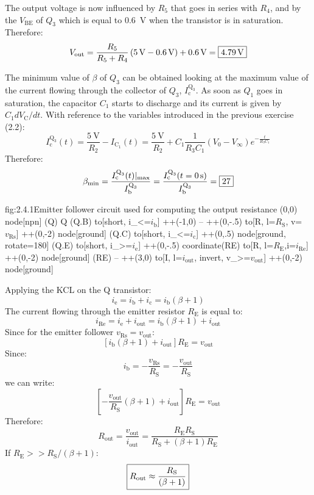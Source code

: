 The output voltage is now influenced by $R_5$ that goes in series with $R_4$, and by the $V_\text{BE}$ of $Q_3$ which is equal to \SI{0.6}{\volt} when the transistor is in saturation. Therefore:
\[V_\text{out}=\frac{R_5}{R_5+R_4}\left(\SI{5}{\volt}-\SI{0.6}{\volt}\right)+\SI{0.6}{\volt}=\boxed{\SI{4.79}{\volt}}\]

The minimum value of $\beta$ of $Q_3$ can be obtained looking at the maximum value of the current flowing through the collector of $Q_3$, $I_\text{c}^{\text{Q}_3}$. As soon as $Q_1$ goes in saturation, the capacitor $C_1$ starts to discharge and its current is given by $C_1dV_\text{C}/dt$. With reference to the variables introduced in the previous exercise (2.2):
\[I_\text{c}^{\text{Q}_3}(t)=\frac{\SI{5}{\volt}}{R_2}-I_{\text{C}_1}(t)=\frac{\SI{5}{\volt}}{R_2}+C_1\frac{1}{R_3C_1}\left(V_0-V_\infty\right)e^{-\frac{t}{R_3C_1}}\]
Therefore:
\[\beta_\text{min}=\frac{I_\text{c}^{\text{Q}_3}(t)|_\text{max}}{I_\text{b}^{\text{Q}_3}}=\frac{I_\text{c}^{\text{Q}_3}(t=\SI{0}{\second})}{I_\text{b}^{\text{Q}_3}}=\boxed{27}\]


\begin{circuit}{fig:2.4.1}{Emitter follower circuit used for computing the output resistance}
    (0,0) node[npn] (Q) {Q}
    (Q.B) to[short, i_<=$i_\text{b}$] ++(-1,0) -- ++(0,-.5) 
    to[R, l=$R_\text{S}$, v=$v_\text{Rs}$] ++(0,-2)
    node[ground] {}
    (Q.C) to[short, i_<=$i_\text{c}$] ++(0,.5) node[ground, rotate=180] {}
    (Q.E) to[short, i_>=$i_\text{e}$] ++(0,-.5) coordinate(RE)
    to[R, l=$R_\text{E}$,i=$i_\text{Re}$] ++(0,-2)
    node[ground] {}
    (RE) -- ++(3,0)
    to[I, l=$i_\text{out}$, invert, v_>=$v_\text{out}$] ++(0,-2)
    node[ground] {}
\end{circuit}

Applying the KCL on the Q transistor:
\[i_\text{e}=i_\text{b}+i_\text{c}=i_\text{b}\left(\beta+1\right)\]
The current flowing through the emitter resistor $R_\text{E}$ is equal to:
\[i_\text{Re}=i_\text{e}+i_\text{out}=i_\text{b}\left(\beta+1\right)+i_\text{out}\]
Since for the emitter follower $v_\text{Rs}=v_\text{out}$:
\[\left[i_\text{b}\left(\beta+1\right)+i_\text{out}\right]R_\text{E}=v_\text{out}\]
Since:
\[i_\text{b}=-\frac{v_\text{Rs}}{R_\text{S}}=-\frac{v_\text{out}}{R_\text{S}}\]
we can write:
\[\left[-\frac{v_\text{out}}{R_\text{S}}\left(\beta+1\right)+i_\text{out}\right]R_\text{E}=v_\text{out}\]
Therefore:
\[R_\text{out}=\frac{v_\text{out}}{i_\text{out}}=\frac{R_\text{E}R_\text{S}}{R_\text{S}+\left(\beta+1\right)R_\text{E}}\]
If $R_\text{E}>>R_\text{S}/(\beta+1)$:
\[\boxed{R_\text{out}\approx\frac{R_\text{S}}{\left(\beta+1\right)}}\]


